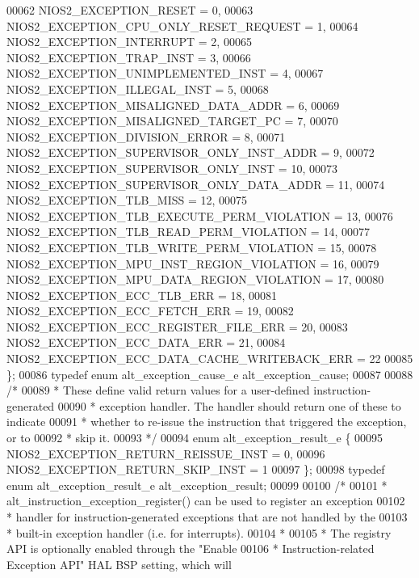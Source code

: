 \begin{DoxyCode}
00062   NIOS2_EXCEPTION_RESET                        = 0,
00063   NIOS2_EXCEPTION_CPU_ONLY_RESET_REQUEST       = 1,
00064   NIOS2_EXCEPTION_INTERRUPT                    = 2,
00065   NIOS2_EXCEPTION_TRAP_INST                    = 3,
00066   NIOS2_EXCEPTION_UNIMPLEMENTED_INST           = 4,
00067   NIOS2_EXCEPTION_ILLEGAL_INST                 = 5,
00068   NIOS2_EXCEPTION_MISALIGNED_DATA_ADDR         = 6,
00069   NIOS2_EXCEPTION_MISALIGNED_TARGET_PC         = 7,
00070   NIOS2_EXCEPTION_DIVISION_ERROR               = 8,
00071   NIOS2_EXCEPTION_SUPERVISOR_ONLY_INST_ADDR    = 9,
00072   NIOS2_EXCEPTION_SUPERVISOR_ONLY_INST         = 10,
00073   NIOS2_EXCEPTION_SUPERVISOR_ONLY_DATA_ADDR    = 11,
00074   NIOS2_EXCEPTION_TLB_MISS                     = 12,
00075   NIOS2_EXCEPTION_TLB_EXECUTE_PERM_VIOLATION   = 13,
00076   NIOS2_EXCEPTION_TLB_READ_PERM_VIOLATION      = 14,
00077   NIOS2_EXCEPTION_TLB_WRITE_PERM_VIOLATION     = 15,
00078   NIOS2_EXCEPTION_MPU_INST_REGION_VIOLATION    = 16,
00079   NIOS2_EXCEPTION_MPU_DATA_REGION_VIOLATION    = 17,
00080   NIOS2_EXCEPTION_ECC_TLB_ERR                  = 18,
00081   NIOS2_EXCEPTION_ECC_FETCH_ERR                = 19,
00082   NIOS2_EXCEPTION_ECC_REGISTER_FILE_ERR        = 20,
00083   NIOS2_EXCEPTION_ECC_DATA_ERR                 = 21,
00084   NIOS2_EXCEPTION_ECC_DATA_CACHE_WRITEBACK_ERR = 22
00085 \};
00086 \textcolor{keyword}{typedef} \textcolor{keyword}{enum} alt_exception_cause_e alt_exception_cause;
00087 
00088 \textcolor{comment}{/*}
00089 \textcolor{comment}{ * These define valid return values for a user-defined instruction-generated}
00090 \textcolor{comment}{ * exception handler. The handler should return one of these to indicate}
00091 \textcolor{comment}{ * whether to re-issue the instruction that triggered the exception, or to}
00092 \textcolor{comment}{ * skip it.}
00093 \textcolor{comment}{ */}
00094 \textcolor{keyword}{enum} alt_exception_result_e \{
00095   NIOS2_EXCEPTION_RETURN_REISSUE_INST = 0,
00096   NIOS2_EXCEPTION_RETURN_SKIP_INST    = 1
00097 \};
00098 \textcolor{keyword}{typedef} \textcolor{keyword}{enum} alt_exception_result_e alt_exception_result;
00099 
00100 \textcolor{comment}{/*}
00101 \textcolor{comment}{ * alt\_instruction\_exception\_register() can be used to register an exception}
00102 \textcolor{comment}{ * handler for instruction-generated exceptions that are not handled by the}
00103 \textcolor{comment}{ * built-in exception handler (i.e. for interrupts).}
00104 \textcolor{comment}{ *}
00105 \textcolor{comment}{ * The registry API is optionally enabled through the "Enable}
00106 \textcolor{comment}{ * Instruction-related Exception API" HAL BSP setting, which will}

\end{DoxyCode}
